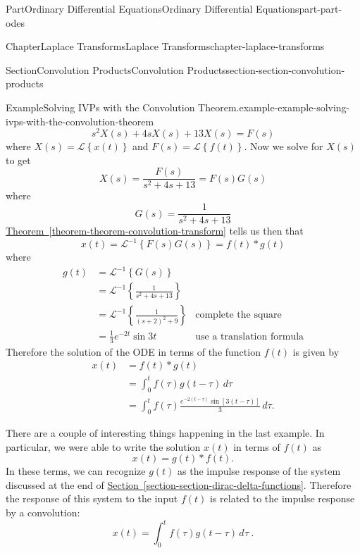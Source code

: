 \documentclass[twoside,10pt,]{book}
\newcommand{\xreffont}{\relax}
\numberwithin{equation}{part}
\newcommand{\Laplace}[1]{\mathcal{L}\set{#1}}
\newcommand{\iLaplace}[1]{\mathcal{L}^{-1}\set{#1}}
\newcommand{\dd}[2][]{\, d^{#1} #2\ }
\newcommand{\set}[1]{\left\{ #1 \right\}}
\begin{document}
\begin{partptx}{Part}{Ordinary Differential Equations}{}{Ordinary Differential Equations}{}{}{part-part-odes}
\begin{chapterptx}{Chapter}{Laplace Transforms}{}{Laplace Transforms}{}{}{chapter-laplace-transforms}
\begin{sectionptx}{Section}{Convolution Products}{}{Convolution Products}{}{}{section-section-convolution-products}
\begin{example}{Example}{Solving IVPs with the Convolution Theorem.}{example-example-solving-ivps-with-the-convolution-theorem}
\begin{equation*}
s^{2}X(s) +4sX(s) + 13X(s) = F(s)
\end{equation*}
where \(X(s) = \Laplace{x(t)}\) and \(F(s) = \Laplace{f(t)}\). Now we solve for \(X(s)\) to get%
\begin{equation*}
X(s) = \frac{F(s)}{s^{2}+4s+13} = F(s)G(s)
\end{equation*}
where%
\begin{equation*}
G(s) = \frac{1}{s^{2}+4s+13}
\end{equation*}
\hyperref[theorem-theorem-convolution-transform]{Theorem~{\xreffont\ref{theorem-theorem-convolution-transform}}} tells us then that%
\begin{equation*}
x(t) = \iLaplace{F(s)G(s)} = f(t)*g(t)
\end{equation*}
where%
\begin{align*}
g(t) &= \iLaplace{G(s)}\\
&= \iLaplace{\frac{1}{s^{2}+4s+13}} \\
&= \iLaplace{\frac{1}{(s+2)^{2}+9}} & \text{complete the square}\\
&= \frac{1}{3}e^{-2t}\sin3t & \text{use a translation formula}
\end{align*}
Therefore the solution of the ODE in terms of the function \(f(t)\) is given by%
\begin{align*}
x(t) &= f(t)\ast g(t)\\
&= \int_{0}^{t}f(\tau)g(t-\tau)\,d\tau\\
&= \int_{0}^{t}f(\tau)\frac{e^{-2(t-\tau)}\sin[3(t-\tau)]}{3}\,d\tau\text{.}
\end{align*}
%
\end{example}
There are a couple of interesting things happening in the last example. In particular, we were able to write the solution \(x(t)\) in terms of \(f(t)\) as%
\begin{equation*}
x(t) = g(t)\ast f(t)\text{.}
\end{equation*}
In these terms, we can recognize \(g(t)\) as the impulse response of the system discussed at the end of \hyperref[section-section-dirac-delta-functions]{Section~{\xreffont\ref{section-section-dirac-delta-functions}}}. Therefore the response of this system to the input \(f(t)\) is related to the impulse response by a convolution:%
\begin{equation*}
x(t) = \int_{0}^{t}f(\tau)g(t-\tau)\dd{\tau}\text{.}
\end{equation*}

\end{sectionptx}
\end{chapterptx}
\end{partptx}
\end{document}

